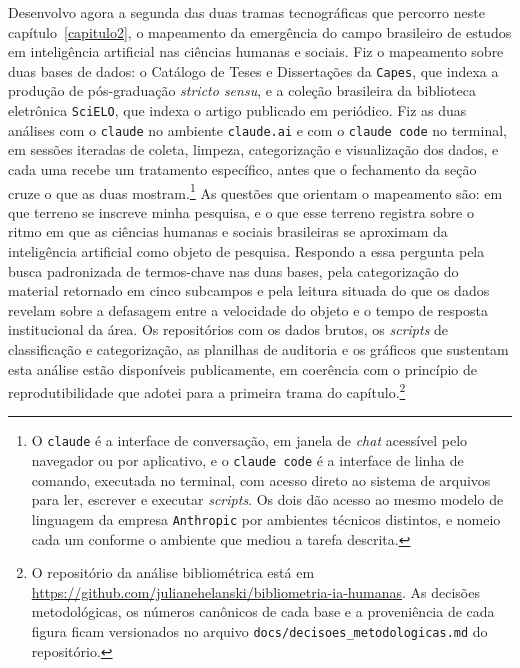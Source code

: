 Desenvolvo agora a segunda das duas tramas tecnográficas que percorro neste capítulo~\ref{capitulo2}, o mapeamento da emergência do campo brasileiro de estudos em inteligência artificial nas ciências humanas e sociais. Fiz o mapeamento sobre duas bases de dados: o Catálogo de Teses e Dissertações da \texttt{Capes}, que indexa a produção de pós-graduação \textit{stricto sensu}, e a coleção brasileira da biblioteca eletrônica \texttt{SciELO}, que indexa o artigo publicado em periódico. Fiz as duas análises com o \texttt{claude} no ambiente \texttt{claude.ai} e com o \texttt{claude code} no terminal, em sessões iteradas de coleta, limpeza, categorização e visualização dos dados, e cada uma recebe um tratamento específico, antes que o fechamento da seção cruze o que as duas mostram.\footnote{O \texttt{claude} é a interface de conversação, em janela de \emph{chat} acessível pelo navegador ou por aplicativo, e o \texttt{claude code} é a interface de linha de comando, executada no terminal, com acesso direto ao sistema de arquivos para ler, escrever e executar \emph{scripts}. Os dois dão acesso ao mesmo modelo de linguagem da empresa \texttt{Anthropic} por ambientes técnicos distintos, e nomeio cada um conforme o ambiente que mediou a tarefa descrita.} As questões que orientam o mapeamento são: em que terreno se inscreve minha pesquisa, e o que esse terreno registra sobre o ritmo em que as ciências humanas e sociais brasileiras se aproximam da inteligência artificial como objeto de pesquisa. Respondo a essa pergunta pela busca padronizada de termos-chave nas duas bases, pela categorização do material retornado em cinco subcampos e pela leitura situada do que os dados revelam sobre a defasagem entre a velocidade do objeto e o tempo de resposta institucional da área. Os repositórios com os dados brutos, os \emph{scripts} de classificação e categorização, as planilhas de auditoria e os gráficos que sustentam esta análise estão disponíveis publicamente, em coerência com o princípio de reprodutibilidade que adotei para a primeira trama do capítulo.\footnote{O repositório da análise bibliométrica está em \url{https://github.com/julianehelanski/bibliometria-ia-humanas}. As decisões metodológicas, os números canônicos de cada base e a proveniência de cada figura ficam versionados no arquivo \texttt{docs/decisoes\_metodologicas.md} do repositório.}


